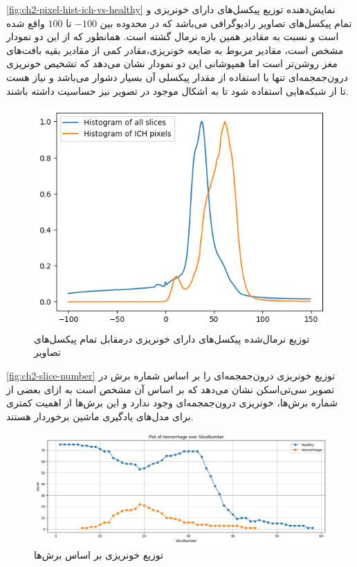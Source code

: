 \autoref{fig:ch2-pixel-hist-ich-vs-healthy}
نمایش‌دهنده توزیع پیکسل‌های دارای خونریزی و تمام پیکسل‌های تصاویر رادیوگرافی می‌باشد که در محدوده بین 
$-100$
تا 
$100$
واقع شده است و نسبت به مقادیر همین بازه نرمال گشته است. همانطور که از این دو نمودار مشخص است، مقادیر مربوط به ضایعه خونریزی،‌مقادر کمی از مقادیر بقیه بافت‌های مغز روشن‌تر است اما همپوشانی این دو نمودار نشان می‌دهد که تشخیص خونریزی درون‌جمجمه‌ای تنها با استفاده از مقدار پیکسلی آن بسیار دشوار می‌باشد و نیاز هست تا از شبکه‌هایی استفاده شود تا به اشکال موجود در تصویر نیز حساسیت داشته باشند.


\begin{figure}[h]
\centering
\includegraphics[width=1.0\linewidth]{"Images/Chapter2/pixel hist ich vs healthy"}
\caption{توزیع نرمال‌شده پیکسل‌های دارای خونریزی درمقابل تمام پیکسل‌های تصاویر}
\label{fig:ch2-pixel-hist-ich-vs-healthy}
\end{figure}


\autoref{fig:ch2-slice-number}
توزیع خونریزی درون‌جمجمه‌ای را بر اساس شماره برش در تصویر سی‌تی‌اسکن نشان می‌دهد که بر اساس آن مشخص است به ازای بعضی از شماره برش‌ها، خونریزی درون‌جمجمه‌ای وجود ندارد و این برش‌ها از اهمیت کمتری برای مدل‌های یادگیری ماشین برخوردار هستند.

\begin{figure}[h]
\centering
\includegraphics[width=1.0\linewidth]{"Images/Chapter2/slice hist"}
\caption{توزیع خونریزی بر اساس برش‌ها}
\label{fig:ch2-slice-hist}
\end{figure}


